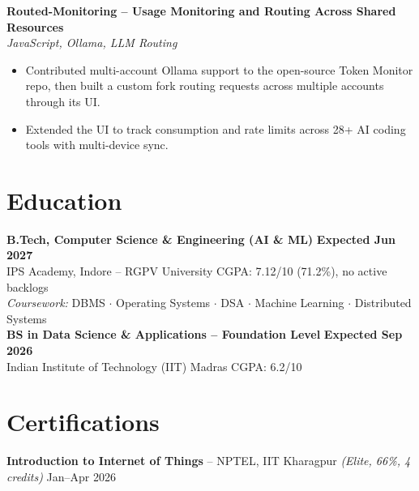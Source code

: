 \documentclass[letterpaper,11pt]{article}
\begin{document}
\vspace{1pt}
\textbf{Routed-Monitoring -- Usage Monitoring and Routing Across Shared Resources} \\
\hspace*{0.15in}\textit{JavaScript, Ollama, LLM Routing}
\begin{itemize}[leftmargin=0.32in,labelsep=0.45em,itemsep=1pt,topsep=2pt,partopsep=0pt,parsep=0pt]
  \item Contributed multi-account Ollama support to the open-source Token Monitor repo, then built a custom
        fork routing requests across multiple accounts through its UI.
  \item Extended the UI to track consumption and rate limits across 28+ AI coding tools with multi-device sync.
\end{itemize}

\section{Education}
\textbf{B.Tech, Computer Science \& Engineering (AI \& ML)} \hfill \textbf{Expected Jun 2027} \\
IPS Academy, Indore -- RGPV University \hfill CGPA: 7.12/10 (71.2\%), no active backlogs \\
\textit{Coursework:} DBMS $\cdot$ Operating Systems $\cdot$ DSA $\cdot$ Machine Learning $\cdot$ Distributed Systems \\[3pt]
\textbf{BS in Data Science \& Applications -- Foundation Level} \hfill \textbf{Expected Sep 2026} \\
Indian Institute of Technology (IIT) Madras \hfill CGPA: 6.2/10

\section{Certifications}
\textbf{Introduction to Internet of Things} -- NPTEL, IIT Kharagpur \textit{(Elite, 66\%, 4 credits)} \hfill Jan--Apr 2026
\end{document}

